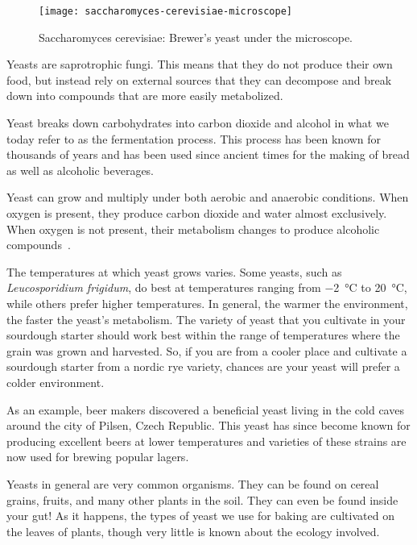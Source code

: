 \begin{figure}[!htb]
\begin{center}
  \texttt{[image: saccharomyces-cerevisiae-microscope]}
  \caption{Saccharomyces cerevisiae: Brewer's yeast under the microscope.}%
  \label{saccharomyces-cerevisiae-microscope}
\end{center}
\end{figure}

Yeasts are saprotrophic fungi. This means that they do not produce their own
food, but instead rely on external sources that they can decompose and break
down into compounds that are more easily metabolized.

Yeast breaks down carbohydrates into carbon dioxide and alcohol in what we today
refer to as the fermentation process. This process has been known for thousands
of years and has been used since ancient times for the making of bread as well
as alcoholic beverages.

Yeast can grow and multiply under both aerobic and anaerobic conditions. When
oxygen is present, they produce carbon dioxide and water almost exclusively.
When oxygen is not present, their metabolism changes to produce alcoholic
compounds~\cite{effects+oxygen+yeast+growth}.

The temperatures at which yeast grows varies. Some yeasts, such as
\emph{Leucosporidium frigidum}, do best at temperatures ranging from \qty{-2}{\degreeCelsius} to
 \qty{20}{\degreeCelsius}, while others prefer higher temperatures. In general, the warmer the
environment, the faster the yeast's metabolism. The variety of yeast
that you cultivate in your sourdough starter should work best within the range
of temperatures where the grain was grown and harvested. So, if you are from a
cooler place and cultivate a sourdough starter from a nordic rye variety,
chances are your yeast will prefer a colder environment.

As an example, beer makers discovered a beneficial yeast living in the cold
caves around the city of Pilsen, Czech Republic. This yeast has since become
known for producing excellent beers at lower temperatures and varieties of
these strains are now used for brewing popular lagers.

Yeasts in general are very common organisms. They can be found on cereal
grains, fruits, and many other plants in the soil. They can even be found
inside your gut! As it happens, the types of yeast we use for baking are
cultivated on the leaves of plants, though very little is known about the
ecology involved.


